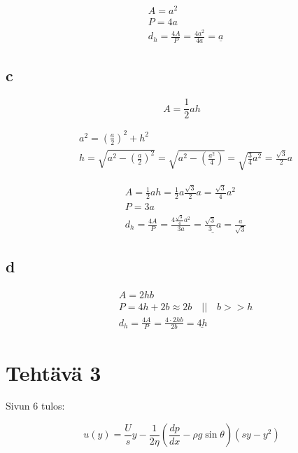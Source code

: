 \documentclass[12pt,a4paper,finnish]{article}
\begin{document}
\begin{align}
 &A = a^2\\
 &P = 4a\\
 &d_h = \frac{4A}{P} = \frac{4a^2}{4a} = \underline{a}
\end{align}

\subsection{c}

\begin{equation}
 A = \frac{1}{2}ah
\end{equation}

\begin{align}
 & a^2 = \left(\frac{a}{2}\right)^2  + h^2\\
 & h = \sqrt{a^2 - \left(\frac{a}{2}\right)^2} = \sqrt{a^2 - \left(\frac{a^2}{4}\right)} = \sqrt{\frac{3}{4}a^2} = \frac{\sqrt{3}}{2}a
\end{align}

\begin{align}
 &A = \frac{1}{2}ah = \frac{1}{2}a\frac{\sqrt{3}}{2}a = \frac{\sqrt{3}}{4}a^2\\
 &P = 3a\\
 &d_h = \frac{4A}{P} = \frac{4\frac{\sqrt{3}}{4}a^2}{3a} = \underline{\frac{\sqrt{3}}{3}a} = \frac{a}{\sqrt{3}}
\end{align}

\subsection{d}

\begin{align}
 &A = 2hb\\
 &P = 4h + 2b \approx 2b \quad \bigg|\bigg| \quad b >> h\\
 &d_h = \frac{4A}{P} = \frac{4\cdot 2hb}{2b} = \underline{4h}
\end{align}

\section{Tehtävä 3}

Sivun 6 tulos:

\begin{framed}
 \begin{equation}
  u(y) = \frac{U}{s}y - \frac{1}{2\eta}\left(\frac{dp}{dx} - \rho g\sin \theta \right)(sy - y^2)
 \end{equation}
\end{framed}
\end{document}
